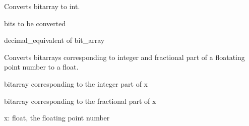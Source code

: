 \documentclass[letterpaper,10pt,english]{sphinxmanual}
\begin{document}
\begin{fulllineitems}
\label{\detokenize{utils:utils.bit_array_utils.bitarray_to_int}}
\pysigstartsignatures
{}
\pysigstopsignatures
\sphinxAtStartPar
Converts bitarray to int.
\begin{description}
\begin{description}
\sphinxAtStartPar
bits to be converted

\end{description}

\begin{description}
\sphinxAtStartPar
decimal\_equivalent of bit\_array

\end{description}

\end{description}

\end{fulllineitems}


\begin{fulllineitems}
\label{\detokenize{utils:utils.bit_array_utils.bitarrays_to_float}}
\pysigstartsignatures
{}
\pysigstopsignatures
\sphinxAtStartPar
Converts bitarrays corresponding to integer and fractional part of a floatating point number to a float.
\begin{description}
\begin{description}
\sphinxAtStartPar
bitarray corresponding to the integer part of x

\sphinxAtStartPar
bitarray corresponding to the fractional part of x

\end{description}

\sphinxAtStartPar
x: float, the floating point number

\end{description}

\end{fulllineitems}
\end{document}
